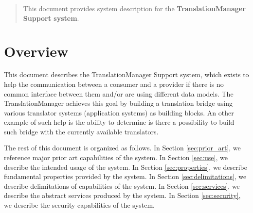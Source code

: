 \documentclass[a4paper]{arrowhead}
\begin{document}
\ArrowheadDate{\today}
\ArrowheadSetup

\begin{center}
  \vspace*{1cm}
  \huge{\arrowtitle}

  \vspace*{0.2cm}
  \LARGE{\arrowtype}
  \vspace*{1cm}

  \vspace*{\fill}


  \vspace*{1cm}
  \vspace*{\fill}

  \begin{abstract}
    This document provides system description for the \textbf{TranslationManager Support system}.
  \end{abstract}

  \vspace*{1cm}

 \end{center}

\newpage

\tableofcontents
\newpage

\section{Overview}
\label{sec:overview}
\color{black}
This document describes the TranslationManager Support system, which exists to help the communication between a consumer and a provider if there is no common interface between them and/or are using different data models.  The TranslationManager achieves this goal by building a translation bridge using various translator systems (application systems) as building blocks. An other example of such help is the ability to determine is there a possibility to build such bridge with the currently available translators.

The rest of this document is organized as follows.
In Section \ref{sec:prior_art}, we reference major prior art capabilities
of the system.
In Section \ref{sec:use}, we describe the intended usage of the system.
In Section \ref{sec:properties}, we describe fundamental properties
provided by the system.
In Section \ref{sec:delimitations}, we describe delimitations of capabilities
of the system.
In Section \ref{sec:services}, we describe the abstract services produced by the system.
In Section \ref{sec:security}, we describe the security capabilities
of the system.
\end{document}
